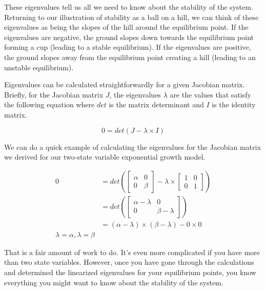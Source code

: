 \documentclass[]{memoir}
\begin{document}
These eigenvalues tell us all we need to know about the stability of the
system. Returning to our illustration of stability as a ball on a hill,
we can think of these eigenvalues as being the slopes of the hill around
the equilibrium point. If the eigenvalues are negative, the ground
slopes down towards the equilibrium point forming a cup (leading to a
stable equilibrium). If the eigenvalues are positive, the ground slopes
away from the equilibrium point creating a hill (leading to an unstable
equilibrium).

Eigenvalues can be calculated straightforwardly for a given Jacobian
matrix. Briefly, for the Jacobian matrix $J$, the eigenvalues $\lambda$
are the values that satisfy the following equation where $det$ is the
matrix determinant and $I$ is the identity matrix.

\[
0=det(J-\lambda \times I)
\]

We can do a quick example of calculating the eigenvalues for the
Jacobian matrix we derived for our two-state variable exponential growth
model.

\[
\begin{aligned}
0 &= det\left(\begin{bmatrix} \alpha  & 0 \\ 0 & \beta \end{bmatrix} - \lambda  \times  \begin{bmatrix} 1 & 0 \\ 0 & 1 \end{bmatrix} \right) \\
 &= det\left(\begin{bmatrix} \alpha -\lambda & 0 \\ 0 & \beta-\lambda \end{bmatrix}\right) \\
 &= (\alpha-\lambda) \times (\beta-\lambda) - 0 \times 0 \\
\lambda = \alpha, \lambda = \beta
\end{aligned}
\]

That is a fair amount of work to do. It's even more complicated if you
have more than two state variables. However, once you have gone through
the calculations and determined the linearized eigenvalues for your
equilibrium points, you know everything you might want to know about the
stability of the system.

\end{document}
